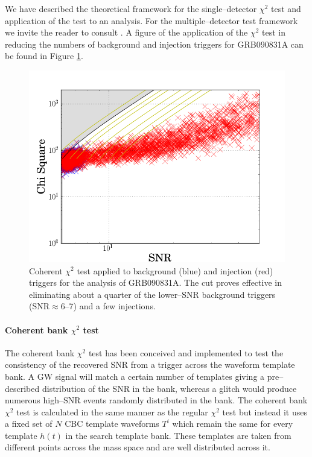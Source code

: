 We have described the theoretical framework for the single--detector $\chi^2$ test and application of the test to an analysis. For the multiple--detector test framework we invite the reader to consult \cite{Harry:2011qh}. A figure of the application of the $\chi^2$ test in reducing the numbers of background and injection triggers for GRB090831A can be found in Figure \ref{cohchi}.
%
\begin{figure}[ht]
\centering
\includegraphics[scale=0.45]{Images/cohChi.png}
\caption{Coherent $\chi^2$ test applied to background (blue) and injection (red) triggers for the analysis of GRB090831A. The cut proves effective in eliminating about a quarter of the lower--SNR background triggers (SNR$\approx$6--7) and a few injections.}
\label{cohchi}
\end{figure}

\paragraph{Coherent bank $\chi^2$ test}
The coherent bank $\chi^2$ test has been conceived and implemented to test the consistency of the recovered SNR from a trigger across the waveform template bank. A \ac{GW} signal will match a certain number of templates giving a pre--described distribution of the SNR in the bank, whereas a glitch would produce numerous high--SNR events randomly distributed in the bank. The coherent bank $\chi^2$ test is calculated in the same manner as the regular $\chi^2$ test but instead it uses a fixed set of $N$ \ac{CBC} template waveforms $T^i$ which remain the same for every template $h(t)$ in the search template bank. These templates are taken from different points across the mass space and are well distributed across it.

